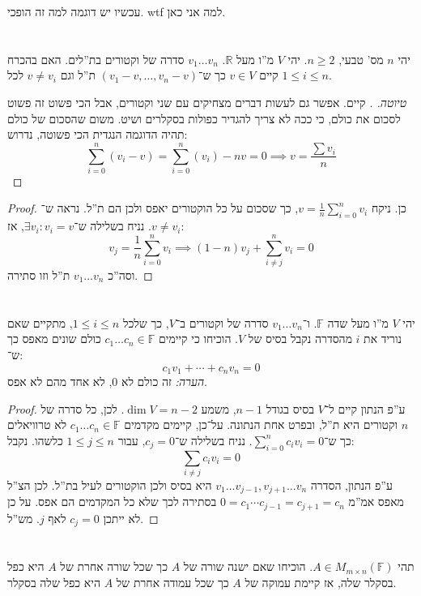 \documentclass[]{article}
\newcommand\R     {\mathbb{R}}
\newcommand\sumni     {\sum_{i = 0}^{n}}
\newcommand\F         {\mathbb{F}}
\newcommand\co        {\colon}
\theoremstyle{definition}
\begin{document}
	
	עכשיו יש דוגמה למה זה הופכי. wtf למה אני כאן. 
	
	\section{}
	יהי $n$ מס' טבעי, $n \ge 2$. יהי $V$ מ''ו מעל $\R$. $v_1 \dots v_n$ סדרה של וקטורים בת''לים. האם בהכרח קיים $v \in V$ כך ש־$(v_1 - v, \dots, v_n -v)$ ת''ל וגם $v \neq v_i$ לכל $1 \le i \le n$. 
	
	\begin{proof}[טיוטה. ]
		קיים. אפשר גם לעשות דברים מצחיקים עם שני וקטורים, אבל הכי פשוט זה פשוט לסכום את כולם, כי ככה לא צריך להגדיר כפולות בסקלרים ושיט. משום שהסכום של כולם תהיה הדוגמה הנגדית הכי פשוטה, נדרוש: 
		\[ \sumni (v_i -v) = \sumni (v_i) - nv = 0 \implies v = \frac{\sum v_i}{n} \]
	\end{proof}
	
	\begin{proof}
		כן. ניקח $v = \frac{1}{n}\sumni v_i$, כך שסכום על כל הוקטורים יאפס ולכן הם ת''ל. נראה ש־$v \neq v_i$. נניח בשלילה ש־$\exists v_i \co v_i = v$, אז: 
		\[ v_j = \frac{1}{n}\sumni v_i \implies (1 - n)v_j + \sum_{i \neq j}^{n} v_i = 0 \]
		וסה''כ $v_1 \dots v_n$ ת''ל וזו סתירה. 
	\end{proof}
	
	
	\section{}
	יהי $V$ מ''ו מעל שדה $\F$. ו־$v_1 \dots v_n$ סדרה של וקטורים ב־$V$, כך שלכל $1 \le i \le n$, מתקיים שאם נוריד את $i$ מהסדרה נקבל בסיס של $V$. הוכיחו כי קיימים $c_1 \dots c_n \in \F$ כולם שונים מאפס כך ש־: 
	\[ c_1v_1 + \cdots + c_n v_n = 0 \]
	\textit{הערה: }זה כולם לא 0, לא אחד מהם לא אפס. 
	
	\begin{proof}
		ע''פ הנתון קיים ל־$V$ בסיס בגודל $n - 1$, משמע $\dim V = n - 2$. לכן, כל סדרה של $n$ וקטורים היא ת''ל, ובפרט אחת הנתונה. על־כן, קיימים מקדמים $c_1 \dots c_n \in \F$ לא טרוויאלים כך ש־$\sumni c_i v_i = 0$. נניח בשלילה ש־$c_j = 0$, עבור $1 \le j \le n$ כלשהו. נקבל: 
		\[ \sum_{i \ne j} c_iv_i = 0 \]
		ע''פ הנתון, הסדרה $v_1 \dots v_{j - 1}, v_{j + 1} \dots v_n$ היא בסיס ולכן הוקטורים לעיל בת''ל. לכן הצ''ל מאפס אמ''מ $0 = c_1 \cdots c_{j - 1} = c_{j + 1} = c_n$ בסתירה לכך שלא כל המקדמים הם אפס. על כן לא ייתכן $c_j = 0$ לאף $j$. מש''ל. 
	\end{proof}
	
	\section{}
	תהי $A \in M_{m \times n}(\F)$. הוכיחו שאם ישנה שורה של $A$ כך שכל שורה אחרת של $A$ היא כפל בסקלר שלה, אז קיימת עמוקה של $A$ כך שכל עמודה אחרת של $A$ היא כפל שלה בסקלר. 
	
\end{document}
